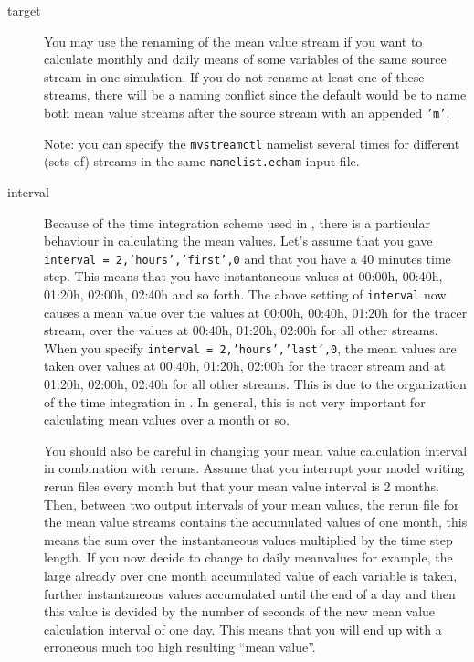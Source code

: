\begin{description}


\item[target]

You may use the renaming of the mean value stream 
if you want to calculate monthly and daily means of some variables of
the same source stream in one simulation. If you do not rename at
least one of
these streams, there will be a naming conflict since the default would
be to name both mean value streams after the source stream with an
appended {\tt 'm'}.

Note: you can specify the {\tt mvstreamctl} namelist several times for
different (sets of) streams in the same {\tt namelist.echam} input file.

\item[interval]

Because of the time integration scheme used in \echam,
there is a particular behaviour
in calculating the mean values. Let's assume that you gave 
\texttt{interval = 2,'hours','first',0} and that you have a 40 minutes
time step. 
This means that you have instantaneous 
values at 00:00h, 00:40h, 01:20h, 02:00h, 02:40h and
so forth.
The above setting of \texttt{interval} now causes a mean value over the values
at 00:00h, 00:40h, 01:20h for the tracer stream, over the values at 
00:40h, 01:20h, 02:00h for all other streams. When you specify 
\texttt{interval = 2,'hours','last',0}, the mean values are taken over values at
00:40h, 01:20h, 02:00h for the tracer stream and at 01:20h, 02:00h, 02:40h
for all other streams. This is due to the organization of the time integration
in \echam. In general, this is not very important for calculating mean values
over a month or so.

You should also be careful in changing your mean value calculation interval
in combination with reruns. Assume that you interrupt your model writing 
rerun files every month but that your mean value interval is 2 months. 
Then, between two output intervals of your mean values, the rerun file
for the mean value streams contains the accumulated values of one month,
this means the sum over the instantaneous values multiplied by the
time step length.
If you now decide to change to daily meanvalues for example, the large already
over one month accumulated value of each variable is taken, further 
instantaneous values accumulated until the end of a day and then this value
is devided by the number of seconds of the new mean value calculation interval
of one day. This means that you will end up with a erroneous much too high 
resulting ``mean value''.

\end{description}



